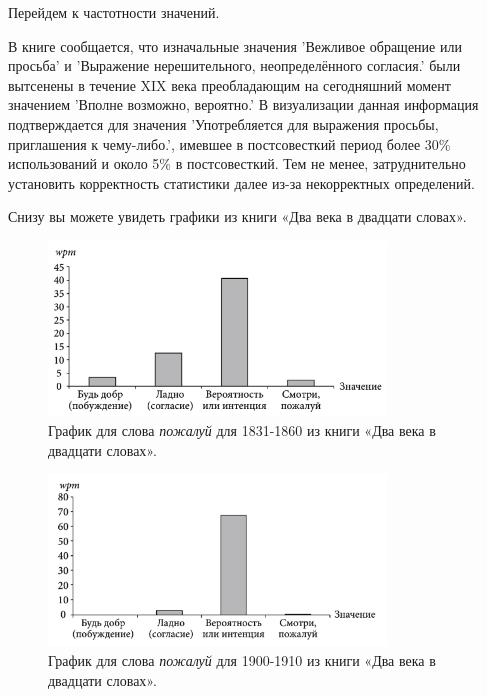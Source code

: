 Перейдем к частотности значений.

В книге сообщается, что изначальные значения ’Вежливое обращение или просьба’
и ’Выражение нерешительного, неопределённого согласия.’ были вытсенены в течение XIX века
преобладающим на сегодняшний момент значением ’Вполне возможно, вероятно.’
В визуализации данная информация подтверждается для значения
’Употребляется для выражения просьбы, приглашения к чему-либо.’,
имевшее в постсовесткий период более 30\% использований и около 5\% в постсовесткий.
Тем не менее, затруднительно установить корректность статистики далее из-за
некорректных определений.

Снизу вы можете увидеть графики из книги «Два века в двадцати словах».

\noindent %
\begin{figure}[H]
    \centering %
    \includegraphics[width=0.8\textwidth]{img/book/pozhaluj/1831-1860}
    \caption{График для слова \textit{пожалуй} для 1831-1860 из книги «Два века в двадцати словах».}
\end{figure}

\begin{figure}[H]
    \centering %
    \includegraphics[width=0.8\textwidth]{img/book/pozhaluj/1900-1910}
    \caption{График для слова \textit{пожалуй} для 1900-1910 из книги «Два века в двадцати словах».}
\end{figure}

